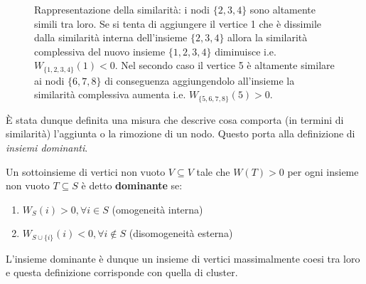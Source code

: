 \begin{figure}[h!]
    \centering
	\qquad\qquad
    \caption{Rappresentazione della similarità: i nodi $\{2,3,4\}$ sono altamente simili tra loro. Se si tenta di aggiungere il vertice 1 che è dissimile dalla similarità interna dell'insieme $\{2,3,4\}$ allora la similarità complessiva del nuovo insieme $\{1,2,3,4\}$ diminuisce i.e. $W_{\{1,2,3,4\}}(1) < 0$. Nel secondo caso il vertice 5 è altamente similare ai nodi $\{6,7,8\}$ di conseguenza aggiungendolo all'insieme la similarità complessiva aumenta i.e. $W_{\{5,6,7,8\}}(5) > 0$.}
\end{figure}

\newpage

È stata dunque definita una misura che descrive cosa comporta (in termini di similarità) l'aggiunta o la rimozione di un nodo. Questo porta alla definizione di \emph{insiemi dominanti}.

\begin{mydef}
	Un sottoinsieme di vertici non vuoto $V \subseteq V$ tale che $W(T) > 0$ per ogni insieme non vuoto $T \subseteq S$ è detto \textbf{dominante} se:
	\begin{enumerate}
		\item $W_S(i) > 0, \forall i \in S$ (omogeneità interna)
		\item $W_{S \cup \{i\}}(i) < 0, \forall i \not\in S$ (disomogeneità esterna)
	\end{enumerate}
\end{mydef}
L'insieme dominante è dunque un insieme di vertici massimalmente coesi tra loro e questa definizione corrisponde con quella di cluster.

